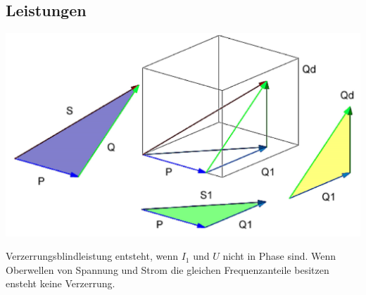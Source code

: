 \subsection{Leistungen}
\begin{minipage}{0.4\linewidth}
    \includegraphics[width=\linewidth]{images/LeistungsDreieck}
\end{minipage}
\hspace{1cm}
\begin{minipage}{0.5\linewidth}
    Verzerrungsblindleistung entsteht, wenn $ I_1 $ und $ U $ nicht in Phase sind. Wenn Oberwellen von Spannung und Strom die gleichen Frequenzanteile besitzen ensteht keine Verzerrung.
\end{minipage}
